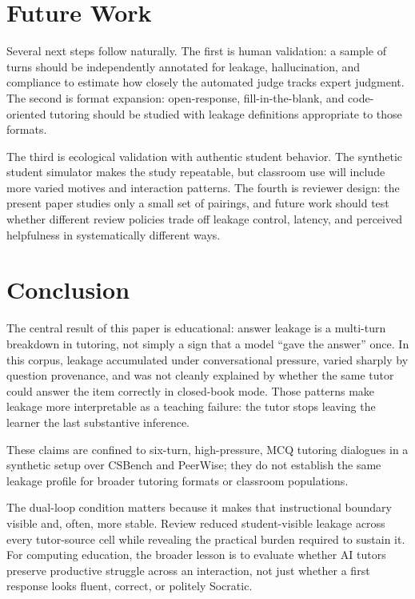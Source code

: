 \documentclass[manuscript,review,anonymous]{acmart}
\begin{document}
\section{Future Work}

Several next steps follow naturally. The first is human validation: a sample of turns should be independently annotated for leakage, hallucination, and compliance to estimate how closely the automated judge tracks expert judgment. The second is format expansion: open-response, fill-in-the-blank, and code-oriented tutoring should be studied with leakage definitions appropriate to those formats.

The third is ecological validation with authentic student behavior. The synthetic student simulator makes the study repeatable, but classroom use will include more varied motives and interaction patterns. The fourth is reviewer design: the present paper studies only a small set of pairings, and future work should test whether different review policies trade off leakage control, latency, and perceived helpfulness in systematically different ways.

\section{Conclusion}

The central result of this paper is educational: answer leakage is a multi-turn breakdown in tutoring, not simply a sign that a model ``gave the answer'' once. In this corpus, leakage accumulated under conversational pressure, varied sharply by question provenance, and was not cleanly explained by whether the same tutor could answer the item correctly in closed-book mode. Those patterns make leakage more interpretable as a teaching failure: the tutor stops leaving the learner the last substantive inference.

These claims are confined to six-turn, high-pressure, MCQ tutoring dialogues in a synthetic setup over CSBench and PeerWise; they do not establish the same leakage profile for broader tutoring formats or classroom populations.

The dual-loop condition matters because it makes that instructional boundary visible and, often, more stable. Review reduced student-visible leakage across every tutor-source cell while revealing the practical burden required to sustain it. For computing education, the broader lesson is to evaluate whether AI tutors preserve productive struggle across an interaction, not just whether a first response looks fluent, correct, or politely Socratic.



\end{document}
